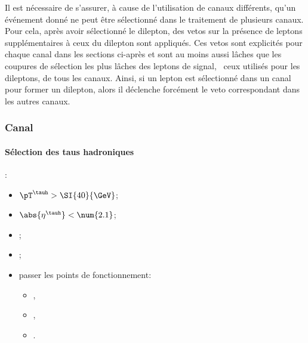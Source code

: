 \par
Il est nécessaire de s'assurer, à cause de l'utilisation de canaux différents, qu'un événement donné ne peut être sélectionné dans le traitement de plusieurs canaux.
Pour cela, après avoir sélectionné le dilepton, des vetos sur la présence de leptons supplémentaires à ceux du dilepton sont appliqués.
Ces vetos sont explicités pour chaque canal dans les sections ci-après et sont au moins aussi lâches que les coupures de sélection les plus lâches des leptons de signal, \ie\ ceux utilisés pour les dileptons, de tous les canaux.
Ainsi, si un lepton est sélectionné dans un canal pour former un dilepton, alors il déclenche forcément le veto correspondant dans les autres canaux.

\subsubsection{Canal \tauh\tauh}\label{chapter-HTT_analysis-section-offline-tt}
\paragraph{Sélection des taus hadroniques}
:
\begin{itemize}
    \item $\pT^{\tauh} > \SI{40}{\GeV}$;
    \item $\abs{\eta^{\tauh}} < \num{2.1}$;
    \item \TauHdz;
    \item \NewDecayModeFinding[footnote];
    \item passer les points de fonctionnement:
        \begin{itemize}
            \item {},
            \item {},
            \item {}.
        \end{itemize}
\end{itemize}
